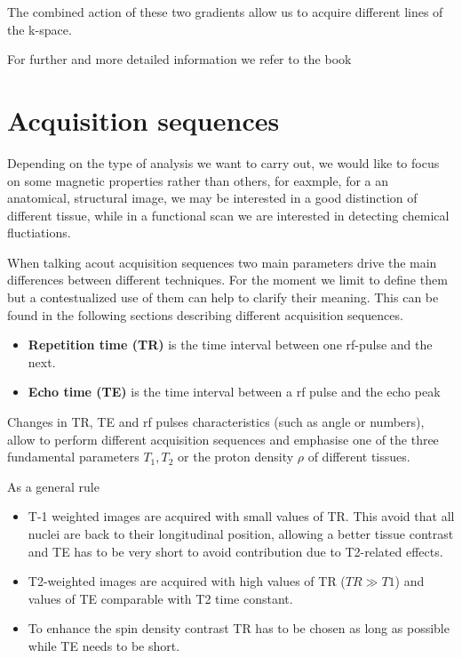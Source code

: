 \documentclass[11pt]{report}
\begin{document}
The combined action of these two gradients allow us to acquire different lines of the k-space.


For further and more detailed information we refer to the book \cite{brown-2014}

\section{Acquisition sequences}
Depending on the type of analysis we want to carry out, we would like to focus on some magnetic properties rather than others, for eaxmple, for a an anatomical, structural image, we may be interested in a good distinction of different tissue, while in a functional scan we are interested in detecting chemical fluctiations.

When talking acout acquisition sequences two main parameters drive the main differences between different techniques.
For the moment we limit to define them but a contestualized use of them can help to clarify their meaning.
This can be found in the following sections describing different acquisition sequences.

\begin{itemize}
\item \textbf{Repetition time (TR)} is the time interval between one rf-pulse and the next.
\item \textbf{Echo time (TE)} is the time interval between a rf pulse and the echo peak
\end{itemize}

Changes in TR, TE and rf pulses characteristics (such as angle or numbers), allow to perform different acquisition sequences and emphasise one of the three fundamental parameters $T_1, T_2$ or the proton density $\rho$ of different tissues.

As a general rule
\begin{itemize}
\item T-1 weighted images are acquired with small values of TR. This avoid that all nuclei are back to their longitudinal position, allowing a better tissue contrast and TE has to be very short to avoid contribution due to T2-related effects.
\item T2-weighted images are acquired with high values of TR ($TR \gg T1$) and values of TE comparable with T2 time constant.
\item To enhance the spin density contrast TR has to be chosen as long as possible while TE needs to be short.
\end{itemize}
\end{document}
